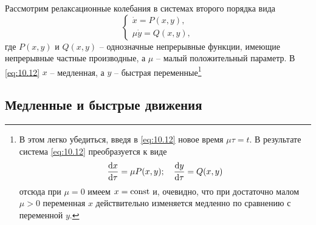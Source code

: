 Рассмотрим релаксационные колебания в системах второго порядка вида
\begin{equation}
        \label{eq:10.2}
        \begin{cases}
                \dot x = P(x,y) ,\\ 
                \mu \dot y = Q(x,y),
        \end{cases}
\end{equation}
где $P(x,y)$ и $Q(x,y)$ -- однозначные непрерывные функции, имеющие
непрерывные частные производные, а $\mu$ -- малый положительный параметр. В
\eqref{eq:10.12} $x$ -- медленная, а $y$ -- быстрая переменные\footnote{В этом легко убедиться, введя
        в \eqref{eq:10.12} новое время $\mu \tau = t$. В результате система
        \eqref{eq:10.12} преобразуется к виде
        \begin{equation}
                \label{eq:}
                \dv{x}{\tau} = \mu P(x,y);\quad \dv{y}{\tau} = Q(x,y)
        \end{equation}
        отсюда при $\mu={0}$ имеем $x= \textrm{const}$ и, очевидно, что при достаточно малом $\mu>0$ переменная $x$ действительно изменяется медленно по сравнению с переменной $y$. 
}

\subsection{Медленные и быстрые движения}%
\label{sub:10.3.1}

